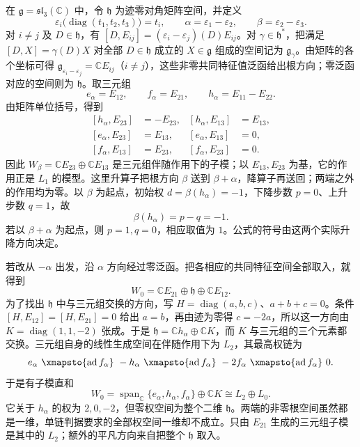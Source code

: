 \begin{example}\label{b5:exm:sl3-adjoint-root-strings}
	在 \(\mathfrak g=\mathfrak{sl}_3(\mathbb C)\) 中，令 \(\mathfrak h\) 为迹零对角矩阵空间，并定义
	\[
		\varepsilon_i\bigl(\operatorname{diag}(t_1,t_2,t_3)\bigr)=t_i, \qquad \alpha=\varepsilon_1-\varepsilon_2,\qquad \beta=\varepsilon_2-\varepsilon_3.
	\]
	对 \(i\ne j\) 及 \(D\in\mathfrak h\)，有 \([D,E_{ij}]=(\varepsilon_i-\varepsilon_j)(D)E_{ij}\)。对 \(\gamma\in\mathfrak h^*\)，把满足 \([D,X]=\gamma(D)X\) 对全部 \(D\in\mathfrak h\) 成立的 \(X\in\mathfrak g\) 组成的空间记为 \(\mathfrak g_\gamma\)。由矩阵的各个坐标可得 \(\mathfrak g_{\varepsilon_i-\varepsilon_j}=\mathbb CE_{ij}\)（\(i\ne j\)），这些非零共同特征值泛函给出根方向；零泛函对应的空间则为 \(\mathfrak h\)。取三元组
	\[
		e_\alpha=E_{12},\qquad f_\alpha=E_{21},\qquad h_\alpha=E_{11}-E_{22}.
	\]
	由矩阵单位括号，得到
	\[
		\begin{aligned}
			[h_\alpha,E_{23}]&=-E_{23},& [h_\alpha,E_{13}]&=E_{13},\\
			[e_\alpha,E_{23}]&=E_{13},& [e_\alpha,E_{13}]&=0,\\
			[f_\alpha,E_{13}]&=E_{23},& [f_\alpha,E_{23}]&=0.
		\end{aligned}
	\]
	因此 \(W_\beta=\mathbb CE_{23}\oplus\mathbb CE_{13}\) 是三元组伴随作用下的子模；以 \(E_{13},E_{23}\) 为基，它的作用正是 \(L_1\) 的模型。这里升算子把根方向 \(\beta\) 送到 \(\beta+\alpha\)，降算子再送回；两端之外的作用均为零。以 \(\beta\) 为起点，初始权 \(d=\beta(h_\alpha)=-1\)，下降步数 \(p=0\)、上升步数 \(q=1\)，故
	\[
		\beta(h_\alpha)=p-q=-1.
	\]
	若以 \(\beta+\alpha\) 为起点，则 \(p=1,q=0\)，相应取值为 \(1\)。公式的符号由这两个实际升降方向决定。

	若改从 \(-\alpha\) 出发，沿 \(\alpha\) 方向经过零泛函。把各相应的共同特征空间全部取入，就得到
	\[
		W_0=\mathbb CE_{21}\oplus\mathfrak h\oplus\mathbb CE_{12}.
	\]
	为了找出 \(\mathfrak h\) 中与三元组交换的方向，写 \(H=\operatorname{diag}(a,b,c)\)、\(a+b+c=0\)。条件 \([H,E_{12}]=[H,E_{21}]=0\) 给出 \(a=b\)，再由迹为零得 \(c=-2a\)，所以这一方向由 \(K=\operatorname{diag}(1,1,-2)\) 张成。于是 \(\mathfrak h=\mathbb Ch_\alpha\oplus\mathbb CK\)，而 \(K\) 与三元组的三个元素都交换。三元组自身的线性生成空间在伴随作用下为 \(L_2\)，其最高权链为
	\[
		e_\alpha\ \xmapsto{\operatorname{ad}f_\alpha}\ -h_\alpha \ \xmapsto{\operatorname{ad}f_\alpha}\ -2f_\alpha \ \xmapsto{\operatorname{ad}f_\alpha}\ 0.
	\]
	于是有子模直和
	\[
		W_0=\operatorname{span}_{\mathbb C}\{e_\alpha,h_\alpha,f_\alpha\} \oplus\mathbb CK\cong L_2\oplus L_0.
	\]
	它关于 \(h_\alpha\) 的权为 \(2,0,-2\)，但零权空间为整个二维 \(\mathfrak h\)。两端的非零根空间虽然都是一维，单链判据要求的全部权空间一维却不成立。只由 \(E_{21}\) 生成的三元组子模是其中的 \(L_2\)；额外的平凡方向来自把整个 \(\mathfrak h\) 取入。
\end{example}

